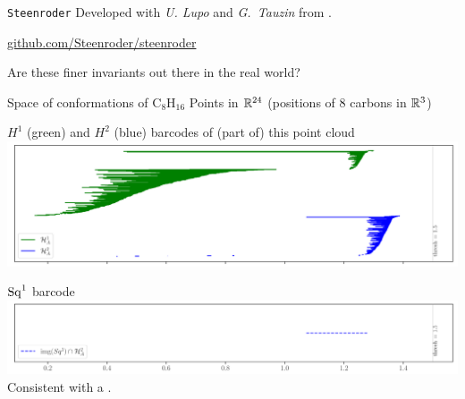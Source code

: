 \begin{frame}{\texttt{Steenroder}}
	Developed with \textit{U. Lupo} and \textit{G.~Tauzin} from .

	\begin{center}
		\hyperlink{https.github.com/Steenroder/steenroder.com}{github.com/Steenroder/steenroder}
	\end{center}

	\pause\bigskip
	 Are these finer invariants out there in the real world?
\end{frame}

%

\begin{frame}{Space of conformations of $\mathrm{C_8H_{16}}$}
	\pause
	Points in $\mathbb{R}^{24}$ (positions of $8$ carbons in $\mathbb{R}^3$)

	\pause\medskip
	$H^1$ (green) and $H^2$ (blue) barcodes of (part of) this point cloud
	\includegraphics[width=\textwidth]{aux/molecule_top.pdf}

	\pause
	$\operatorname{Sq}^1$ barcode
	\includegraphics[width=\textwidth]{aux/molecule_bot.pdf}
	Consistent with a .
\end{frame}

